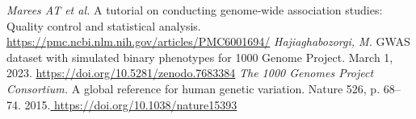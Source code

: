 \documentclass[letterpaper, 11pt]{article}
\begin{document}
\newpage
\begin{thebibliography}{99}
\emph{Marees AT et al. } A tutorial on conducting genome-wide association studies: Quality control and statistical analysis. \url{https://pmc.ncbi.nlm.nih.gov/articles/PMC6001694/}
\emph{Hajiaghabozorgi, M. } GWAS dataset with simulated binary phenotypes for 1000 Genome Project. March 1, 2023. \url{https://doi.org/10.5281/zenodo.7683384}
\emph{The 1000 Genomes Project Consortium.} A global reference for human genetic variation. Nature 526, p. 68–74. 2015.\url{ https://doi.org/10.1038/nature15393}
\end{thebibliography}
\end{document}
